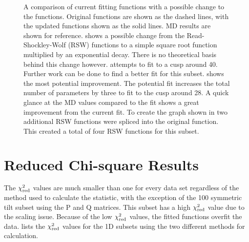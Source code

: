 \documentclass[twoside,senior]{BYUPhys}
\begin{document}
\begin{figure}[ht!]
 
 \caption[Possible changes to fitting functions for the 1D twist subsets.]{\label{fig:updatedGraphs} A comparison of current fitting functions with a possible change to the functions.  Original functions are shown as the dashed lines, with the updated functions shown as the solid lines.  MD results are shown for reference. \protect{} shows a possible change from the Read-Shockley-Wolf (RSW) functions to a simple square root function multiplied by an exponential decay.  There is no theoretical basis behind this change however. \protect{} attempts to fit to a cusp around 40\textdegree{}.  Further work can be done to find a better fit for this subset. \protect{} shows the most potential improvement.  The potential fit increases the total number of parameters by three to fit to the cusp around 28\textdegree.  A quick glance at the MD values compared to the fit shows a great improvement from the current fit.  To create the graph shown in \protect{} two additional RSW functions were spliced into the original function.  This created a total of four RSW functions for this subset.}
 
\end{figure}

\section{Reduced Chi-square Results\label{results:chi2red}}
The $\chi_{\textnormal{red}}^2$ values are much smaller than one for every data set regardless of the method used to calculate the statistic, with the exception of the \textlangle{}100\textrangle{} symmetric tilt subset using the P and Q matrices.  This subset has a high $\chi_{\textnormal{red}}^2$ value due to the scaling issue.  Because of the low $\chi_{\textnormal{red}}^2$ values, the fitted functions overfit the data.\cite{bevington2003}   lists the $\chi_{\textnormal{red}}^2$ values for the 1D subsets using the two different methods for calculation. 
\end{document}
